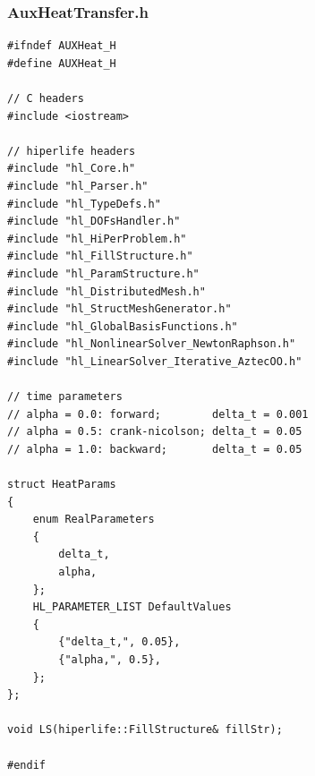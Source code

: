 \documentclass[]{article}
\begin{document}
\subsubsection{AuxHeatTransfer.h} \label{sec: a.h}
\begin{lstlisting}
#ifndef AUXHeat_H
#define AUXHeat_H

// C headers
#include <iostream>

// hiperlife headers
#include "hl_Core.h"
#include "hl_Parser.h"
#include "hl_TypeDefs.h"  
#include "hl_DOFsHandler.h"
#include "hl_HiPerProblem.h"
#include "hl_FillStructure.h"
#include "hl_ParamStructure.h"
#include "hl_DistributedMesh.h" 
#include "hl_StructMeshGenerator.h" 
#include "hl_GlobalBasisFunctions.h"
#include "hl_NonlinearSolver_NewtonRaphson.h"
#include "hl_LinearSolver_Iterative_AztecOO.h"

// time parameters
// alpha = 0.0: forward;        delta_t = 0.001
// alpha = 0.5: crank-nicolson; delta_t = 0.05
// alpha = 1.0: backward;       delta_t = 0.05

struct HeatParams
{
	enum RealParameters
	{
		delta_t,
		alpha,
	};
	HL_PARAMETER_LIST DefaultValues
	{
		{"delta_t,", 0.05},
		{"alpha,", 0.5},
	};
};

void LS(hiperlife::FillStructure& fillStr);

#endif
\end{lstlisting}
\end{document}
